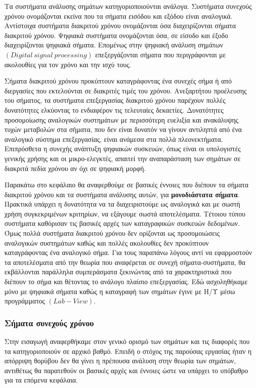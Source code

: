 \documentclass[breaklines=true, 12pt]{article}
\begin{document}
Τα συστήματα ανάλυσης σημάτων κατηγοριοποιούνται ανάλογα. Συστήματα συνεχούς
χρόνου ονομάζονται εκείνα που τα σήματα εισόδου και εξόδου είναι αναλογικά.
Αντίστοιχα συστήματα διακριτού χρόνου ονομάζονται όσα διαχειρίζονται σήματα
διακριτού χρόνου. Ψηφιακά συστήματα ονομάζονται όσα, σε είσοδο και έξοδο
διαχειρίζονται ψηφιακά σήματα. Επομένως στην ψηφιακή ανάλυση σημάτων
\({(Digital\ signal\ processing)}\) επεξεργάζονται σήματα που περιγράφονται με
ακολουθίες για τον χρόνο και την ισχύ τους.

Σήματα διακριτού χρόνου προκύπτουν καταγράφοντας ένα συνεχές σήμα ή από
διεργασίες που εκτελούνται σε διακριτές τιμές του χρόνου. Ανεξαρτήτου
προέλευσης του σήματος, τα συστήματα επεξεργασίας διακριτού χρόνου
παρέχουν πολλές δυνατότητες ελκύοντας το ενδιαφέρον τις τελευταίες
δεκαετίες. Δυνατότητες προσομοίωσης αναλογικών συστημάτων με
περισσότερη ευελιξία και ανακάλυψης τυχών μεταβολών
στα σήματα, που δεν είναι δυνατόν να γίνουν αντιληπτά από ένα αναλογικό
σύστημα επεξεργασίας, είναι ανάμεσα στα πολλά πλεονεκτήματα. Επιπρόσθετα η
συνεχής ανάπτυξη ψηφιακών συσκευών, όπως είναι οι υπολογιστές γενικής χρήσης
και οι μικρο-ελεγκτές, απαιτεί την αναπαράσταση των σημάτων σε διακριτά
πεδία χρόνου αν όχι σε ψηφιακή μορφή.

Παρακάτω στο κεφάλαιο θα αναφερθούμε σε βασικές έννοιες που διέπουν τα σήματα
διακριτού χρόνου και τα συστήματα ανάλυσης αυτών, για \textbf{μονοδιάστατα σήματα}.
Πρακτικά υπάρχει η δυνατότητα να τα διαχειριστούμε ως αναλογικά
και με σωστή χρήση συγκεκριμένων κριτηρίων, να εξάγουμε σωστά αποτελέσματα.
Τέτοιου τύπου συστήματα καθόρισαν τις βασικές αρχές των καταγραφικών
συσκευών δεδομένων. Όμως πολλά συστήματα διακριτού χρόνου
δεν ορίζονται ως προσομοιώσεις αναλογικών συστημάτων καθώς και πολλές
ακολουθίες δεν προκύπτουν καταγράφοντας ένα αναλογικό σήμα. Για τους
παραπάνω λόγους αντί να εφαρμοστούν τα αποτελέσματα από την θεωρία που
αναφέρεται σε συνεχή σήματα-συστήματα, θα εκβάλλονται παράλληλα συμπεράσματα
ξεκινώντας από τα χαρακτηριστικά που διέπουν το σήμα και θέτοντας το
ανάλογο πλαίσιο επεξεργασίας. Εδώ ασχοληθήκαμε μόνο με ψηφιακά σήματα
καθώς η καταγραφή των σημάτων έγινε με Η/Υ μέσω προγράμματος \({(Lab-View)}\).

\subsubsection{Σήματα συνεχούς χρόνου}
\label{sec:org3f815c6}
Στην εισαγωγή αναφερθήκαμε στον γενικό ορισμό των σημάτων και τις διαφορές
που τα κατηγοριοποιούν σε αρχικό βαθμό. Επειδή ο στόχος της παρούσας εργασίας
ήταν η απόρριψη θορύβου δεν θα γίνει η πρέπουσα ανάλυση στην θεωρία των σημάτων,
αντιθέτως θα παρατεθούν οι βασικές αρχές και έννοιες ώστε να υπάρχει το υπόβαθρο
για τα επόμενα κεφάλαια.
\end{document}
